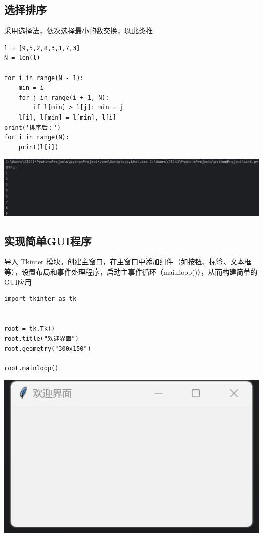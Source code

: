 \documentclass[UTF8,a4paper]{ctexart}
\begin{document}
\begin{sloppypar}
	\subsection{选择排序}
	采用选择法，依次选择最小的数交换，以此类推
	\begin{lstlisting}
l = [9,5,2,8,3,1,7,3]
N = len(l)

for i in range(N - 1):
    min = i
    for j in range(i + 1, N):
        if l[min] > l[j]: min = j
    l[i], l[min] = l[min], l[i]
print('排序后：')
for i in range(N):
    print(l[i])
    \end{lstlisting}
	
	\includegraphics[width = 16cm]{11}
	
	
	\subsection{实现简单GUI程序}
	导入 Tkinter 模块。创建主窗口，在主窗口中添加组件（如按钮、标签、文本框等），设置布局和事件处理程序，启动主事件循环（mainloop()），从而构建简单的GUI应用
\begin{lstlisting}
import tkinter as tk


root = tk.Tk()
root.title("欢迎界面")
root.geometry("300x150")

root.mainloop()

\end{lstlisting}
	
	\includegraphics[width = 16cm]{12}
	

\end{sloppypar}
\end{document}
